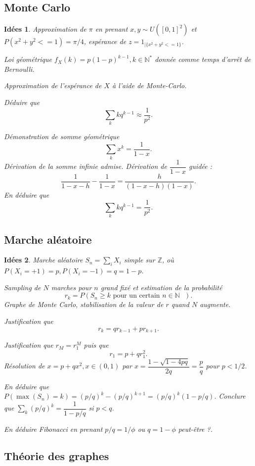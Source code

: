 \documentclass[a4paper,12pt, notitlepage]{article}
\theoremstyle{plain}
\newtheorem{idee}{Idées}
\newcommand{\N}{\mathbb{N}}
\begin{document}
\subsection{Monte Carlo}

\begin{idee}
	Approximation de $\pi$ en prenant $x,y \sim U([0,1]^2)$ et $P(x^2 + y^2 <= 1) = \pi/4$, espérance de $z = 1_{|\{x^2 + y^2 <= 1\}}$.

	Loi géométrique $f_X(k) = p(1-p)^{k-1}, k\in\N^*$ donnée comme temps d'arrêt de Bernoulli.
	
	Approximation de l'espérance de $X$ à l'aide de Monte-Carlo.
	
	Déduire que 
		\[ \sum_k k q^{k-1} \approx \dfrac1{p^2}. \]
		
	Démonstration de somme géométrique
		\[ \sum_k x^k = \dfrac1{1-x}. \]
	Dérivation de la somme infinie admise. Dérivation de $\dfrac1{1-x}$ guidée : 
		\[ \dfrac1{1-x-h} - \dfrac1{1-x} = \dfrac{h}{(1-x-h)(1-x)}. \]
	En déduire que
		\[ \sum_k k q^{k-1} = \dfrac1{p^2}. \]
	
\end{idee}


\subsection{Marche aléatoire}

\begin{idee}
	Marche aléatoire $S_n = \sum_i X_i$ simple sur $\mathbb{Z}$, où $P(X_i = +1) = p, P(X_i = -1) = q = 1-p$.
	
	Sampling de $N$ marches pour $n$ grand fixé et estimation de la probabilité
		\[ r_k = P(S_n \geq k \text{ pour un certain $n\in\N$ }). \]
	Graphe de Monte Carlo, stabilisation de la valeur de $r$ quand $N$ augmente.
	
	Justification que 
		\[ r_k = q r_{k-1} + p r_{k+1}. \]
		
	Justification que $r_M = r_1^M$ puis que
		\[ r_1 = p + q r_1^2. \]
	Résolution de $x = p + qx^2, x \in (0,1)$ par $x = \dfrac{1-\sqrt{1-4pq}}{2q} = \dfrac{p}{q}$ pour $p<1/2$.
	
	En déduire que $P(\max(S_n) = k) = (p/q)^k - (p/q)^{k+1} = (p/q)^k (1-p/q)$. 
	Conclure que $\sum_k (p/q)^k = \dfrac{1}{1-p/q}$ si $p<q$.
	
	En déduire Fibonacci en prenant $p/q = 1/\phi$ ou $q = 1-\phi$ peut-être ?.
\end{idee}


\subsection{Théorie des graphes}
\end{document}
